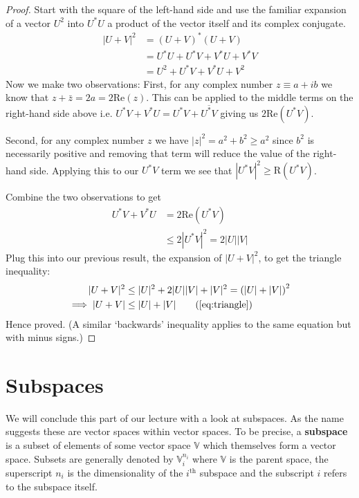 \documentclass[english,seminar,headertitle]{lecture}
\begin{document}
\begin{proof}
	Start with the square of the left-hand side and use the familiar expansion of a vector $U^2$ into $U^* U$ a product of the vector itself and its complex conjugate.
	\begin{align*}
		 |U+V|^2 &= (U+V)^*(U+V) \\
		 		 &= U^*U + U^*V + V^*U + V^*V \\
		 		 &= U^2 + U^*V + V^*U + V^2
	\end{align*}
	Now we make two observations: First, for any complex number $z \equiv a+ib$ we know that $z + \bar{z} = 2a = 2\textrm{Re}(z)$. This can be applied to the middle terms on the right-hand side above i.e. $U^*V + V^*U = U^*V + \overline{U^*V}$ giving us $2\textrm{Re}(U^*V)$.
	
	Second, for any complex number $z$ we have $|z|^2 = a^2 + b^2 \ge a^2$ since $b^2$ is necessarily positive and removing that term will reduce the value of the right-hand side. Applying this to our $U^*V$ term we see that $|U^*V|^2 \ge \textrm{R}(U^*V)$.
	
	Combine the two observations to get
	\begin{align*}
		U^*V + V^*U &= 2\textrm{Re}(U^*V) \\
					&\le 2 |U^*V|^2 = 2|U||V|
	\end{align*}
	Plug this into our previous result, the expansion of $|U+V|^2$, to get the triangle inequality:
	\begin{align*}
		|U+V|^2 &\le |U|^2 + 2|U||V| + |V|^2 = \left(|U|+|V|\right)^2 \\
\implies |U+V| &\le |U| + |V| \tag{\ref{eq:triangle}}
	\end{align*}
	Hence proved. (A similar `backwards' inequality applies to the same equation but with minus signs\cite{backwardstriangle}.)
\end{proof}

\section{Subspaces}

We will conclude this part of our lecture with a look at subspaces. As the name suggests these are vector spaces within vector spaces. To be precise, a \textbf{subspace} is a subset of elements of some vector space $\mathbb{V}$ which themselves form a vector space. Subsets are generally denoted by $\mathbb{V}^{n_i}_i$ where $\mathbb{V}$ is the parent space, the superscript $n_i$ is the dimensionality of the $i^\textrm{th}$ subspace and the subscript $i$ refers to the subspace itself.
\end{document}
